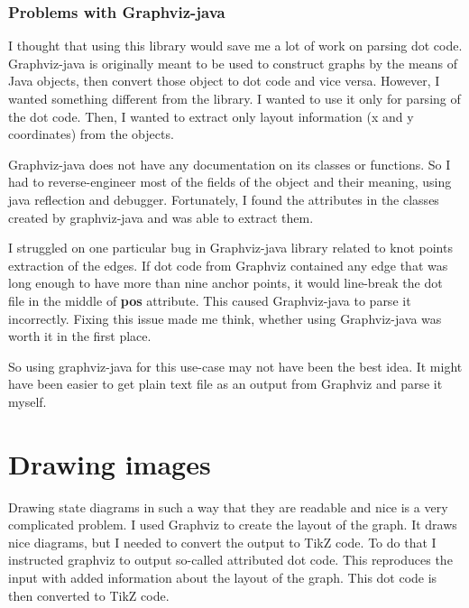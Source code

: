 \documentclass{ctuthesis}
\begin{document}
\subsection{Problems with Graphviz-java}
\label{subsec:graphviz-java-problems}
I thought that using this library would save me a lot of work on parsing dot code. Graphviz-java is originally meant to be used to construct graphs by the means of Java objects, then convert those object to dot code and vice versa. However, I wanted something different from the library. I wanted to use it only for parsing of the dot code. Then, I wanted to extract only layout information (x and y coordinates) from the objects. 

Graphviz-java does not have any documentation on its classes or functions. So I had to reverse-engineer most of the fields of the object and their meaning, using java reflection and debugger. Fortunately, I found the attributes in the classes created by graphviz-java and was able to extract them. 

I struggled on one particular bug in Graphviz-java library related to knot points extraction of the edges. If dot code from Graphviz contained any edge that was long enough to have more than nine anchor points, it would line-break the dot file in the middle of \textbf{pos} attribute. This caused Graphviz-java to parse it incorrectly. Fixing this issue made me think, whether using Graphviz-java was worth it in the first place.

So using graphviz-java for this use-case may not have been the best idea. It might have been easier to get plain text file as an output from Graphviz and parse it myself. 

\chapter{Drawing images}
Drawing state diagrams in such a way that they are readable and nice is a very complicated problem. 
I used Graphviz to create the layout of the graph. It draws nice diagrams, but I needed to convert the output to TikZ code. To do that I instructed graphviz to output so-called attributed dot code. This reproduces the input with added information about the layout of the graph. This dot code is then converted to TikZ code. 

\end{document}
